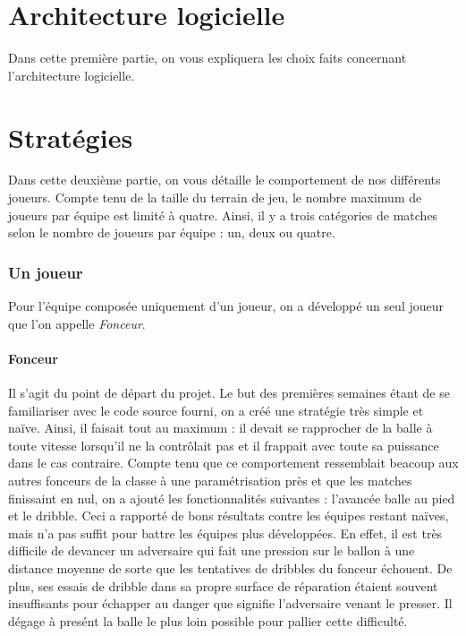 \documentclass[12pt,a4paper]{article}
\begin{document}
\newpage

\part{Architecture logicielle} %
Dans cette premi\`ere partie, on vous expliquera les choix faits 
concernant l'architecture logicielle.

\newpage

\part{Strat\'egies}
Dans cette deuxi\`eme partie, on vous d\'etaille le comportement de nos 
diff\'erents joueurs.
Compte tenu de la taille du terrain de jeu, le nombre maximum de joueurs par 
\'equipe est limit\'e \`a quatre. 
Ainsi, il y a trois cat\'egories de matches 
selon le nombre de joueurs par \'equipe : un, deux ou quatre.

\section{Un joueur}
Pour l'\'equipe compos\'ee uniquement d'un joueur, on a d\'evelopp\'e un seul 
joueur que l'on appelle {\itshape Fonceur}. 

\subsection*{Fonceur}
Il s'agit du point de d\'epart du projet. Le but des premi\`eres semaines 
\'etant de se familiariser avec le code source fourni, on a cr\'e\'e une 
strat\'egie tr\`es simple et na\"ive. 
Ainsi, il faisait tout au maximum : il devait se rapprocher de la balle \`a 
toute vitesse lorsqu'il ne la contr\^olait pas et il frappait avec toute sa 
puissance dans le cas contraire. 
Compte tenu que ce comportement ressemblait beacoup aux autres fonceurs de la 
classe \`a une param\'etrisation pr\`es et que les matches finissaint en nul, on 
a ajout\'e les fonctionnalit\'es suivantes : l'avanc\'ee balle au pied et le 
dribble. 
Ceci a rapport\'e de bons r\'esultats contre les \'equipes restant 
na\"ives, mais n'a pas suffit pour battre les \'equipes plus d\'evelopp\'ees. 
En effet, il est tr\`es difficile de devancer un adversaire qui fait une 
pression sur le ballon \`a une distance moyenne de sorte que les tentatives de 
dribbles du fonceur \'echouent.
De plus, ses essais de dribble dans sa propre surface de r\'eparation 
\'etaient souvent insuffisants pour \'echapper au danger que signifie 
l'adversaire venant le presser. Il d\'egage \`a pres\'ent la balle le plus loin 
possible pour pallier cette difficult\'e.
\end{document}
